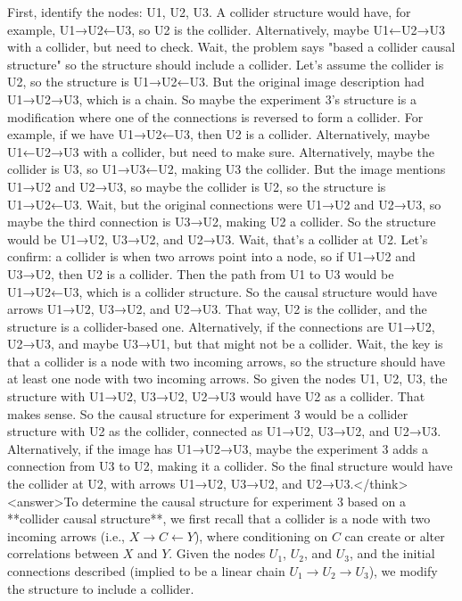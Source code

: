 First, identify the nodes: U1, U2, U3. A collider structure would have, for example, U1→U2←U3, so U2 is the collider. Alternatively, maybe U1←U2→U3 with a collider, but need to check. Wait, the problem says "based a collider causal structure" so the structure should include a collider. Let's assume the collider is U2, so the structure is U1→U2←U3. But the original image description had U1→U2→U3, which is a chain. So maybe the experiment 3's structure is a modification where one of the connections is reversed to form a collider. For example, if we have U1→U2←U3, then U2 is a collider. Alternatively, maybe U1←U2→U3 with a collider, but need to make sure. Alternatively, maybe the collider is U3, so U1→U3←U2, making U3 the collider. But the image mentions U1→U2 and U2→U3, so maybe the collider is U2, so the structure is U1→U2←U3. Wait, but the original connections were U1→U2 and U2→U3, so maybe the third connection is U3→U2, making U2 a collider. So the structure would be U1→U2, U3→U2, and U2→U3. Wait, that's a collider at U2. Let's confirm: a collider is when two arrows point into a node, so if U1→U2 and U3→U2, then U2 is a collider. Then the path from U1 to U3 would be U1→U2←U3, which is a collider structure. So the causal structure would have arrows U1→U2, U3→U2, and U2→U3. That way, U2 is the collider, and the structure is a collider-based one. Alternatively, if the connections are U1→U2, U2→U3, and maybe U3→U1, but that might not be a collider. Wait, the key is that a collider is a node with two incoming arrows, so the structure should have at least one node with two incoming arrows. So given the nodes U1, U2, U3, the structure with U1→U2, U3→U2, U2→U3 would have U2 as a collider. That makes sense. So the causal structure for experiment 3 would be a collider structure with U2 as the collider, connected as U1→U2, U3→U2, and U2→U3. Alternatively, if the image has U1→U2→U3, maybe the experiment 3 adds a connection from U3 to U2, making it a collider. So the final structure would have the collider at U2, with arrows U1→U2, U3→U2, and U2→U3.</think><answer>To determine the causal structure for experiment 3 based on a **collider causal structure**, we first recall that a collider is a node with two incoming arrows (i.e., \(X \to C \leftarrow Y\)), where conditioning on \(C\) can create or alter correlations between \(X\) and \(Y\). Given the nodes \(U_1\), \(U_2\), and \(U_3\), and the initial connections described (implied to be a linear chain \(U_1 \to U_2 \to U_3\)), we modify the structure to include a collider.  


